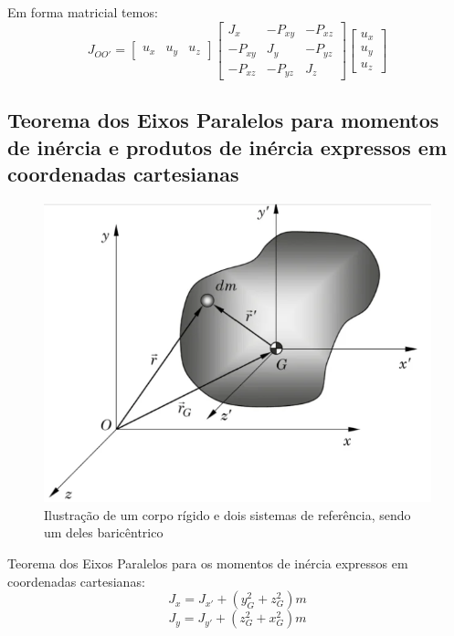 \documentclass[a4paper, 12pt]{article}
\begin{document}
		Em forma matricial temos:
		\begin{equation}
			J_{OO'} = \begin{bmatrix}
			u_x & u_y & u_z 
			\end{bmatrix}\begin{bmatrix}
			J_x & -P_{xy} & -P_{xz}\\
			-P_{xy} & J_y & -P_{yz}\\
			-P_{xz} & -P_{yz} & J_z
\end{bmatrix}\begin{bmatrix}
			u_x\\ u_y \\u_z
\end{bmatrix}				
		\end{equation}

	\subsection{Teorema dos Eixos Paralelos para momentos de inércia e produtos de inércia expressos em coordenadas cartesianas}
		\begin{figure}[h]
			\center
			\includegraphics[scale=0.5]{imagens/a5.png} 
			\caption{Ilustração de um corpo rígido e dois sistemas de referência, sendo um deles baricêntrico}
		\end{figure}	
		Teorema dos Eixos Paralelos para os momentos de inércia expressos em coordenadas cartesianas:
		\begin{equation}
			J_x = J_{x'} + (y_G^2 + z_G^2)m
		\end{equation}
		\begin{equation}
			J_y = J_{y'} + (z_G^2 + x_G^2)m
		\end{equation}
\end{document}
